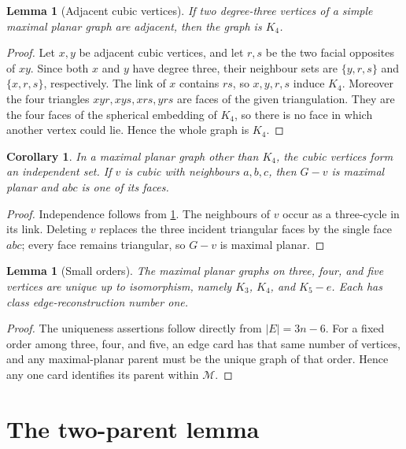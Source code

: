 \documentclass[11pt]{article}
\newtheorem{lemma}[theorem]{Lemma}
\newtheorem{corollary}[theorem]{Corollary}
\theoremstyle{definition}
\theoremstyle{remark}
\newcommand{\M}{\mathcal M}
\begin{document}
\begin{lemma}[Adjacent cubic vertices]\label{lem:adjacent-cubic}
If two degree-three vertices of a simple maximal planar graph are adjacent,
then the graph is \(K_4\).
\end{lemma}

\begin{proof}
Let \(x,y\) be adjacent cubic vertices, and let \(r,s\) be the two facial
opposites of \(xy\).  Since both \(x\) and \(y\) have degree three, their
neighbour sets are \(\{y,r,s\}\) and \(\{x,r,s\}\), respectively.  The
link of \(x\) contains \(rs\), so \(x,y,r,s\) induce \(K_4\).  Moreover the
four triangles \(xyr,xys,xrs,yrs\) are faces of the given triangulation.
They are the four faces of the spherical embedding of \(K_4\), so there is
no face in which another vertex could lie.  Hence the whole graph is
\(K_4\).
\end{proof}

\begin{corollary}\label{cor:cubic-independent}
In a maximal planar graph other than \(K_4\), the cubic vertices form an
independent set.  If \(v\) is cubic with neighbours \(a,b,c\), then
\(G-v\) is maximal planar and \(abc\) is one of its faces.
\end{corollary}

\begin{proof}
Independence follows from \cref{lem:adjacent-cubic}.  The neighbours of
\(v\) occur as a three-cycle in its link.  Deleting \(v\) replaces the three
incident triangular faces by the single face \(abc\); every face remains
triangular, so \(G-v\) is maximal planar.
\end{proof}

\begin{lemma}[Small orders]\label{lem:small-orders}
The maximal planar graphs on three, four, and five vertices are unique up to
isomorphism, namely \(K_3\), \(K_4\), and \(K_5-e\).  Each has class
edge-reconstruction number one.
\end{lemma}

\begin{proof}
The uniqueness assertions follow directly from \(|E|=3n-6\).  For a fixed
order among three, four, and five, an edge card has that same number of
vertices, and any maximal-planar parent must be the unique graph of that
order.  Hence any one card identifies its parent within \(\M\).
\end{proof}

\section{The two-parent lemma}\label{app:two-parent}
\end{document}
